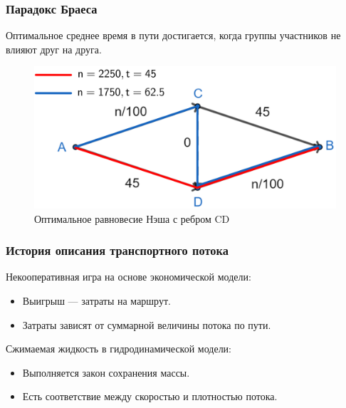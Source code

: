 \documentclass{beamer}
\begin{document}
\begin{frame}\frametitle{Парадокс Браеса}
	Оптимальное среднее время в пути достигается, когда группы участников не влияют друг на друга.
	\begin{figure}[H]
	\begin{center}
		\begin{minipage}[h]{0.60\linewidth}
			\includegraphics[width=1\linewidth]{imgs/braess_after_opt_short.png}
			\caption{Оптимальное равновесие Нэша с ребром CD}
			\label{ris:braess_3}
		\end{minipage}
	\end{center}
\end{figure}
\end{frame}

\begin{frame}\frametitle{История описания транспортного потока}
	Некооперативная игра на основе экономической модели:
	\begin{itemize}
		\item Выигрыш --- затраты на маршрут.
		
		\item Затраты зависят от суммарной величины потока по пути. 
	\end{itemize}

	\bigskip

	Сжимаемая жидкость в гидродинамической модели:
	\begin{itemize}
		\item Выполняется закон сохранения массы.
		
		\item Есть соответствие между скоростью и плотностью потока.
	\end{itemize}
\end{frame}
\end{document}

